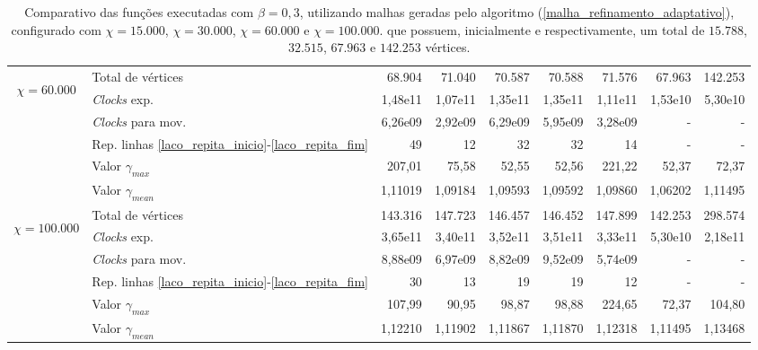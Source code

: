 \begin{table}
\begin{center}
\begin{tabular}{|c|l|r|r|r|r|r|r|r|}
\hline %
\multirow{5}{*}{\begin{sideways}$\chi = 60.000$\end{sideways} } 
& Total de vértices                                                     & 68.904 & 71.040 & 70.587 & 70.588 & 71.576 & 67.963 & 142.253 \\
& {\it Clocks} exp.	                                             	& 1,48e11 & 1,07e11 & 1,35e11 & 1,35e11 & 1,11e11 & 1,53e10 &  5,30e10 \\
& {\it Clocks} para mov.                                  		& 6,26e09 & 2,92e09 & 6,29e09 & 5,95e09 & 3,28e09 & - & - \\
& Rep. linhas \ref{laco_repita_inicio}-\ref{laco_repita_fim} 		& 49 & 12 & 32 & 32 & 14 & - & - \\
& Valor $\gamma_{max}$							& 207,01 & 75,58 & 52,55 & 52,56 & 221,22 & 52,37 & 72,37 \\
& Valor $\gamma_{mean}$							& 1,11019 & 1,09184 & 1,09593 & 1,09592 & 1,09860 & 1,06202 & 1,11495 \\
\hline %
\multirow{5}{*}{\begin{sideways}$\chi = 100.000$\end{sideways} } 
& Total de vértices                                                     & 143.316 & 147.723 & 146.457 & 146.452 & 147.899 & 142.253 & 298.574 \\
& {\it Clocks} exp.	                                             	& 3,65e11 & 3,40e11 & 3,52e11 & 3,51e11 & 3,33e11 & 5,30e10 & 2,18e11 \\
& {\it Clocks} para mov.                                      		& 8,88e09 & 6,97e09 & 8,82e09 & 9,52e09 & 5,74e09 & - & - \\
& Rep. linhas \ref{laco_repita_inicio}-\ref{laco_repita_fim} 		& 30 & 13 & 19 & 19 & 12 & - & - \\
& Valor $\gamma_{max}$							& 107,99 & 90,95 & 98,87 & 98,88 & 224,65 & 72,37 & 104,80 \\
& Valor $\gamma_{mean}$							& 1,12210 & 1,11902 & 1,11867 & 1,11870 & 1,12318 & 1,11495 & 1,13468 \\
\hline %
\end{tabular}%
\end{center}
\caption{Comparativo das funções executadas com $\beta = 0,3$, utilizando malhas geradas pelo algoritmo (\ref{malha_refinamento_adaptativo}), configurado com $\chi = 15.000$, $\chi = 30.000$, $\chi = 60.000$ e $\chi = 100.000$. que possuem, inicialmente e respectivamente, um total de $15.788$, $32.515$, $67.963$ e $142.253$ vértices.} %
\label{tabelaComparativo_beta_3}
\end{table}


